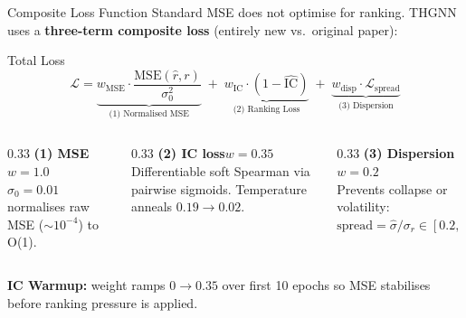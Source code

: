 \documentclass[aspectratio=169, 10pt]{beamer}
\begin{document}
\begin{frame}{Composite Loss Function}
  Standard MSE does not optimise for ranking.
  THGNN uses a \textbf{three-term composite loss}
  \textcolor{negative}{\footnotesize(entirely new vs.\ original paper)}:

  \begin{block}{Total Loss}
    \vspace{-0.3em}
    \[
      \mathcal{L} = \underbrace{w_\text{MSE}
        \cdot \frac{\text{MSE}(\hat{r}, r)}{\sigma_0^2}}_{\text{(1) Normalised MSE}}
      \;+\;\underbrace{w_\text{IC} \cdot (1 - \widehat{\text{IC}})}_{\text{(2) Ranking Loss}}
      \;+\;\underbrace{w_\text{disp} \cdot \mathcal{L}_\text{spread}}_{\text{(3) Dispersion}}
    \]
    \vspace{-0.3em}
  \end{block}

  \begin{columns}[T]
    \begin{column}{0.33\textwidth}
      \small\textbf{(1) MSE}\quad$w=1.0$\\
      $\sigma_0=0.01$ normalises raw MSE (${\sim}10^{-4}$) to O(1).
    \end{column}
    \begin{column}{0.33\textwidth}
      \small\textbf{(2) IC loss}\quad$w=0.35$\\
      Differentiable soft Spearman via pairwise sigmoids.
      Temperature anneals $0.19\!\to\!0.02$.
    \end{column}
    \begin{column}{0.33\textwidth}
      \small\textbf{(3) Dispersion}\quad$w=0.2$\\
      Prevents collapse or volatility:
      $\text{spread}=\hat{\sigma}/\sigma_r\in[0.2,\,2.0]$
    \end{column}
  \end{columns}

  \smallskip
  \textbf{IC Warmup:} weight ramps $0\!\to\!0.35$ over first 10 epochs
  so MSE stabilises before ranking pressure is applied.
\end{frame}
\end{document}
